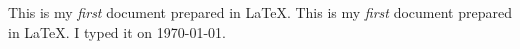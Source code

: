 \documentclass{article}
\begin{document}
This is my \emph{first} document prepared in \LaTeX.
This is my \emph{first} document prepared in \LaTeX. I typed it
on \today.






\end{document}

